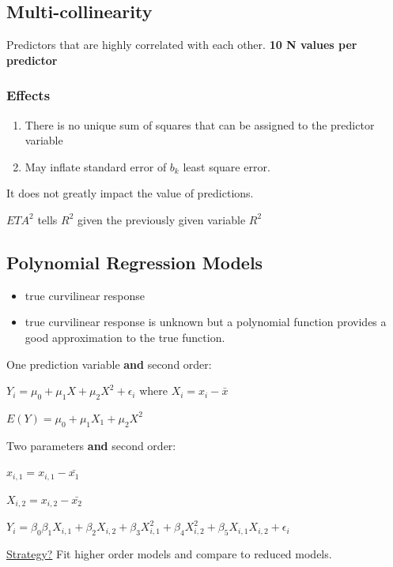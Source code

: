 \documentclass[11pt]{article}
\begin{document}
\subsection{Multi-collinearity}
\label{sec:org7258e50}

Predictors that are highly correlated with each other. \textbf{10 N values per predictor}

\subsubsection{Effects}
\label{sec:org6f51ff8}
\begin{enumerate}
\item There is no unique sum of squares that can be assigned to the predictor
variable
\item May inflate standard error of \(b_k\) least square error.
\end{enumerate}

It does not greatly impact the value of predictions.

\({ETA}^2\) tells \(R^2\) given the previously given variable \(R^2\)
\subsection{Polynomial Regression Models}
\label{sec:orgc4c6ea3}

\begin{itemize}
\item true curvilinear response
\item true curvilinear response is unknown but a polynomial function provides a good
approximation to the true function.
\end{itemize}


One prediction variable \textbf{and} second order:

\(Y_i = \mu_0 + \mu_1 X + \mu_2 X^2 + \epsilon_i\) where \(X_i = x_i - \bar{x}\)

\(E(Y) = \mu_0 + \mu_1 X_1 + \mu_2 X^2\)

Two parameters \textbf{and} second order:

\(x_{i,1} = x_{i,1} - \bar{x_1}\)

\(X_{i,2} = x_{i,2} - \bar{x_2}\)

\(Y_i = \beta_0 \beta_1 X_{i,1} + \beta_2 X_{i,2} + \beta_3 X_{i,1}^2 + \beta_4
X_{i,2}^2 + \beta_5 X_{i,1} X_{i,2} + \epsilon_i\)

\uline{Strategy?} Fit higher order models and compare to reduced models.
\end{document}
